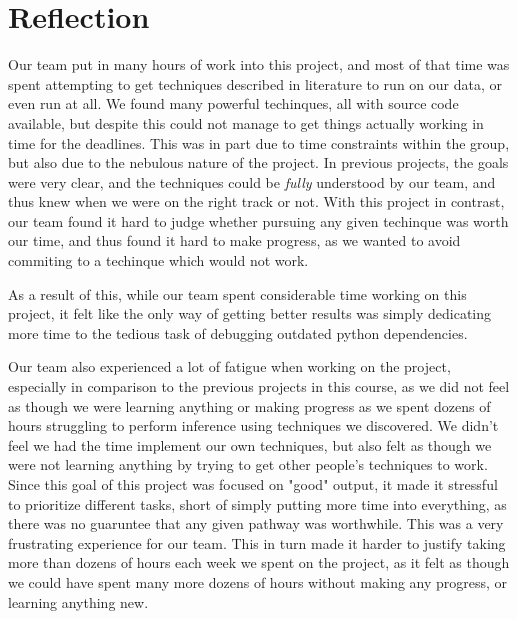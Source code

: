 \section{Reflection}

Our team put in many hours of work into this project, and most of that time was spent attempting to get techniques described in literature to run on our data, or even run at all. We found many powerful techinques, all with source code available, but despite this could not manage to get things actually working in time for the deadlines. This was in part due to time constraints within the group, but also due to the nebulous nature of the project. In previous projects, the goals were very clear, and the techniques could be \emph{fully} understood by our team, and thus knew when we were on the right track or not. With this project in contrast, our team found it hard to judge whether pursuing any given techinque was worth our time, and thus found it hard to make progress, as we wanted to avoid commiting to a techinque which would not work.

As a result of this, while our team spent considerable time working on this project, it felt like the only way of getting better results was simply dedicating more time to the tedious task of debugging outdated python dependencies. 

Our team also experienced a lot of fatigue when working on the project, especially in comparison to the previous projects in this course, as we did not feel as though we were learning anything or making progress as we spent dozens of hours struggling to perform inference using techniques we discovered. We didn't feel we had the time implement our own techniques, but also felt as though we were not learning anything by trying to get other people's techniques to work. Since this goal of this project was focused on "good" output, it made it stressful to prioritize different tasks, short of simply putting more time into everything, as there was no guaruntee that any given pathway was worthwhile. This was a very frustrating experience for our team. This in turn made it harder to justify taking more than dozens of hours each week we spent on the project, as it felt as though we could have spent many more dozens of hours without making any progress, or learning anything new.
